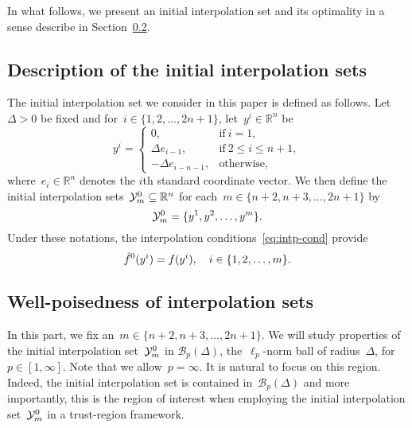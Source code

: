 \documentclass[draft]{article}
\numberwithin{equation}{section}
\theoremstyle{definition}
\newcommand{\obj}{f}
\newcommand{\objm}[1][]{\hat{\obj}\ifblank{#1}{}{^{#1}}}
\newcommand{\R}{\mathbb{R}}
\newcommand{\set}[2][]{#1\{#2#1\}}
\newcommand{\solvername}[1]{\textsc{#1}\xspace}
\newcommand{\xpt}[1][]{\mathcal{Y}\ifblank{#1}{}{^{#1}}}
\begin{document}
In what follows, we present an initial interpolation set and its optimality in a sense describe in Section~\ref{subsec:well-poisedness}.

\subsection{Description of the initial interpolation sets}

The initial interpolation set we consider in this paper is defined as follows.
Let~$\Delta > 0$ be fixed and for~$i \in \set{1, 2, \dots, 2n + 1}$, let~$y^i \in \R^n$ be
\begin{equation*}
    y^i =
    \begin{cases}
        0,                      & \text{if} ~ i = 1,\\
        \Delta e_{i - 1},       & \text{if} ~ 2 \le i \le n + 1,\\
        -\Delta e_{i - n - 1},  & \text{otherwise},
    \end{cases}
\end{equation*}
where~$e_i \in \R^n$ denotes the $i$th standard coordinate vector.
We then define the initial interpolation sets~$\xpt[0]_m \subseteq \R^n$ for each~$m \in \set{n + 2, n + 3, \dots, 2n + 1}$ by
\begin{equation*}
    \xpt[0]_m = \set{y^1, y^2, \dots, y^m}.
\end{equation*}
Under these notations, the interpolation conditions~\eqref{eq:intp-cond} provide
\begin{equation}
    \label{eq:intp-cond-0}
    \objm[0](y^i) = \obj(y^i), \quad i \in \set{1, 2, \dots, m}.
\end{equation}

\subsection{Well-poisedness of interpolation sets}
\label{subsec:well-poisedness}

In this part, we fix an~$m \in \set{n + 2, n + 3, \dots, 2n + 1}$.
We will study properties of the initial interpolation set~$\xpt[0]_m$ in $\mathcal{B}_p(\Delta)$, the~$\ell_p$-norm ball of radius~$\Delta$, for~$p \in [1, \infty]$.
Note that we allow~$p = \infty$.
It is natural to focus on this region.
Indeed, the initial interpolation set is contained in~$\mathcal{B}_p(\Delta)$ and more importantly, this is the region of interest when employing the initial interpolation set~$\xpt[0]_m$ in a trust-region framework.
\end{document}
